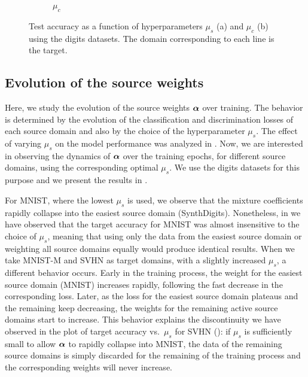 \begin{figure}
\begin{subfigure}[b]{0.45\textwidth}
		\caption{$\mu_c$}
		\label{fig:hyperparam_mu_c}
	\end{subfigure}
	\caption{Test accuracy as a function of hyperparameters $\mu_s$ (a) and $\mu_c$ (b) using the digits datasets. The domain corresponding to each line is the target.}
	\label{fig:hyperparam}
\end{figure}

\subsection{Evolution of the source weights}
\label{sec:alpha_evol}
Here, we study the evolution of the source weights ${\bm{\alpha}}$ over training. The behavior is determined by the evolution of the classification and discrimination losses of each source domain and also by the choice of the hyperparameter $\mu_s$. The effect of varying $\mu_s$ on the model performance was analyzed in . Now, we are interested in observing the dynamics of ${\bm{\alpha}}$ over the training epochs, for different source domains, using the corresponding optimal $\mu_s$. We use the digits datasets for this purpose and we present the results in .

For MNIST, where the lowest $\mu_s$ is used, we observe that the mixture coefficients rapidly collapse into the easiest source domain (SynthDigits). Nonetheless, in  we have observed that the target accuracy for MNIST was almost insensitive to the choice of $\mu_s$, meaning that using only the data from the easiest source domain or weighting all source domains equally would produce identical results. When we take MNIST-M and SVHN as target domains, with a slightly increased $\mu_s$, a different behavior occurs. Early in the training process, the weight for the easiest source domain (MNIST) increases rapidly, following the fast decrease in the corresponding loss. Later, as the loss for the easiest source domain plateaus and the remaining keep decreasing, the  weights for the remaining active source domains start to increase. This behavior explains the discontinuity we have observed in the plot of target accuracy vs.\ $\mu_s$ for SVHN (): if $\mu_s$ is sufficiently small to allow ${\bm{\alpha}}$ to rapidly collapse into MNIST, the data of the remaining source domains is simply discarded for the remaining of the training process and the corresponding weights will never increase.

